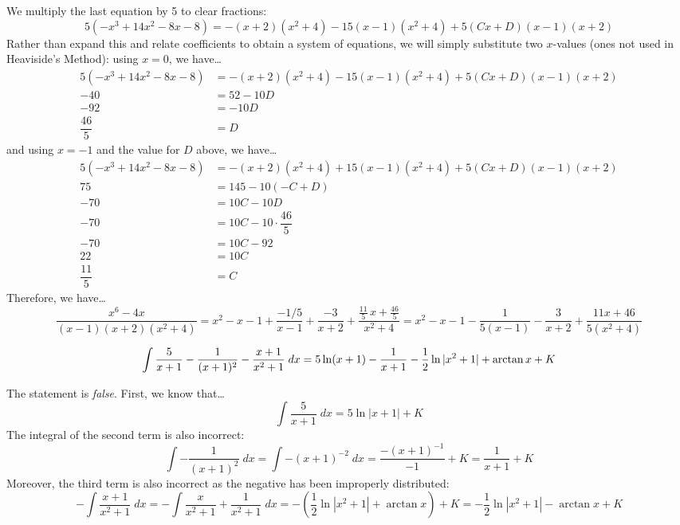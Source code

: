 \documentclass[11pt,letterpaper]{article}
\begin{document}
We multiply the last equation by 5 to clear fractions:
	\[
	5(-x^3 + 14x^2 - 8x - 8)= -(x + 2)(x^2 + 4) - 15(x - 1)(x^2 + 4) + 5(Cx + D)(x - 1)(x + 2)
	\]
Rather than expand this and relate coefficients to obtain a system of equations, we will simply substitute two $x$-values (ones not used in Heaviside's Method): using $x= 0$, we have\dots
	\[
	\begin{aligned}
	5(-x^3 + 14x^2 - 8x - 8)&= -(x + 2)(x^2 + 4) - 15(x - 1)(x^2 + 4) + 5(Cx + D)(x - 1)(x + 2) \\
	-40&= 52 - 10D \\
	-92&= -10 D \\
	\dfrac{46}{5}&= D
	\end{aligned}
	\]
and using $x= -1$ and the value for $D$ above, we have\dots
	\[
	\begin{aligned}
	5(-x^3 + 14x^2 - 8x - 8)&= -(x + 2)(x^2 + 4) + 15(x - 1)(x^2 + 4) + 5(Cx + D)(x - 1)(x + 2) \\
	75&= 145 - 10 (-C + D) \\
	-70&= 10C - 10D \\
	-70&= 10C - 10 \cdot \dfrac{46}{5} \\
	-70&= 10C - 92 \\
	22&= 10C \\
	\dfrac{11}{5}&= C
	\end{aligned}
	\]
Therefore, we have\dots
	\[
	\dfrac{x^6 - 4x}{(x - 1)(x + 2)(x^2 + 4)}= x^2 - x - 1 + \dfrac{-1/5}{x - 1} + \dfrac{-3}{x + 2} + \dfrac{\frac{11}{5}\,x + \frac{46}{5}}{x^2 + 4}= x^2 - x - 1 - \dfrac{1}{5(x - 1)} - \dfrac{3}{x + 2} + \dfrac{11x + 46}{5(x^2 + 4)}
	\] \pvspace{1.3cm}



	\[
	\displaystyle\int \dfrac{5}{x + 1} - \dfrac{1}{(x + 1)^2} - \dfrac{x + 1}{x^2 + 1} \;dx= 5 \ln(x + 1) - \dfrac{1}{x + 1} - \frac{1}{2} \ln|x^2 + 1| + \arctan x + K
	\] \pspace

\sol The statement is \textit{false}. First, we know that\dots
	\[
	\int \dfrac{5}{x + 1} \;dx= 5 \ln|x + 1| + K
	\]
The integral of the second term is also incorrect:
	\[
	\int -\dfrac{1}{(x + 1)^2} \;dx= \int -(x + 1)^{-2} \;dx= \dfrac{-(x + 1)^{-1}}{-1} + K= \dfrac{1}{x + 1} + K
	\]
Moreover, the third term is also incorrect as the negative has been improperly distributed:
	\[
	- \int \dfrac{x + 1}{x^2 + 1} \;dx= -\int \dfrac{x}{x^2 + 1} + \dfrac{1}{x^2 + 1} \;dx= - \left( \frac{1}{2} \ln|x^2 + 1| + \arctan x \right) + K= -\frac{1}{2} \ln|x^2 + 1| - \arctan x + K
	\]
\end{document}
